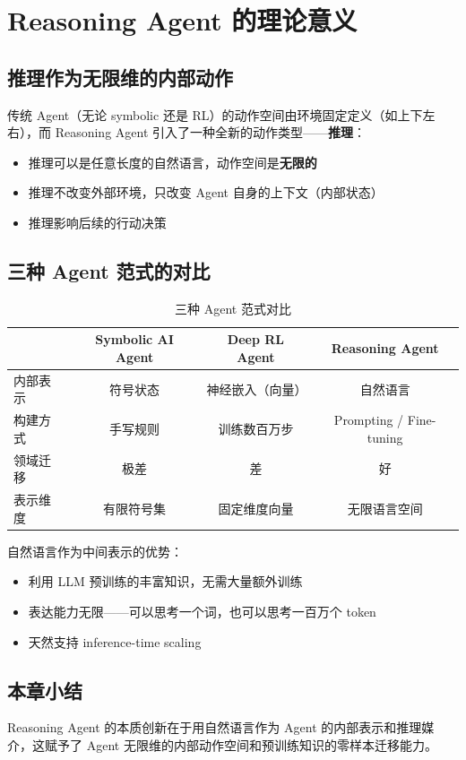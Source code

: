 \section{Reasoning Agent 的理论意义}

\subsection{推理作为无限维的内部动作}

传统 Agent（无论 symbolic 还是 RL）的动作空间由环境固定定义（如上下左右），而 Reasoning Agent 引入了一种全新的动作类型——\textbf{推理}：

\begin{itemize}
    \item 推理可以是任意长度的自然语言，动作空间是\textbf{无限的}
    \item 推理不改变外部环境，只改变 Agent 自身的上下文（内部状态）
    \item 推理影响后续的行动决策
\end{itemize}

\subsection{三种 Agent 范式的对比}

\begin{table}[H]
\centering
\begin{tabular}{lccc}
\toprule
& \textbf{Symbolic AI Agent} & \textbf{Deep RL Agent} & \textbf{Reasoning Agent} \\
\midrule
内部表示 & 符号状态 & 神经嵌入（向量） & 自然语言 \\
构建方式 & 手写规则 & 训练数百万步 & Prompting / Fine-tuning \\
领域迁移 & 极差 & 差 & 好 \\
表示维度 & 有限符号集 & 固定维度向量 & 无限语言空间 \\
\bottomrule
\end{tabular}
\caption{三种 Agent 范式对比}
\end{table}

自然语言作为中间表示的优势：
\begin{itemize}
    \item 利用 LLM 预训练的丰富知识，无需大量额外训练
    \item 表达能力无限——可以思考一个词，也可以思考一百万个 token
    \item 天然支持 inference-time scaling
\end{itemize}

\subsection{本章小结}

Reasoning Agent 的本质创新在于用自然语言作为 Agent 的内部表示和推理媒介，这赋予了 Agent 无限维的内部动作空间和预训练知识的零样本迁移能力。


